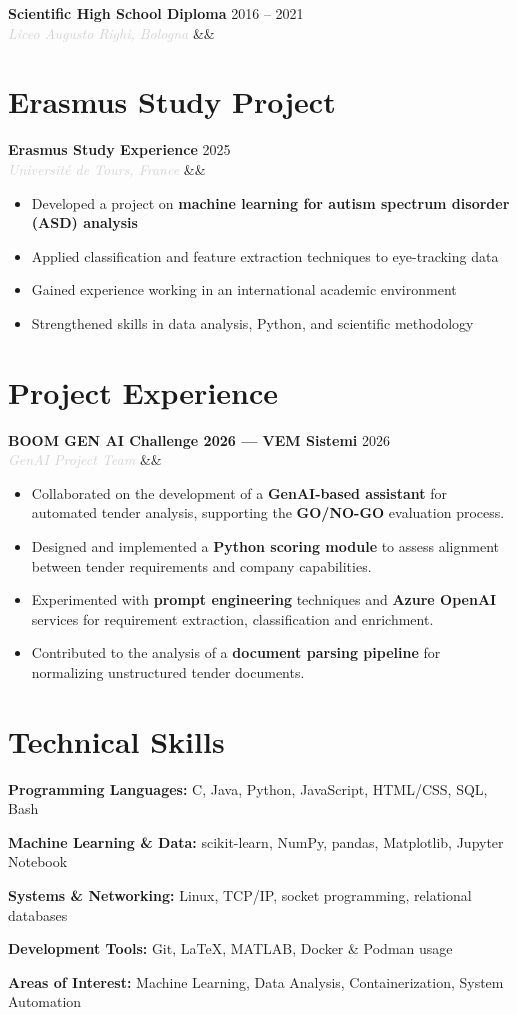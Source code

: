 \documentclass[a4paper,10pt]{article}
\newcommand{\entry}[4]{%
  \noindent\textbf{#1} \hfill \textcolor{accent}{#2}\\
  \textit{\textcolor{lightgray}{#3}}%
  \ifx&#4&\else\\\vspace{0.2em}#4\fi
  \vspace{0.5em}
}
\newcommand{\entrylist}[5]{%
  \noindent\textbf{#1} \hfill \textcolor{accent}{#2}\\
  \textit{\textcolor{lightgray}{#3}}%
  \ifx&#4&\else\\\vspace{0.2em}#4\fi
  \vspace{0.3em}
  \begin{itemize}#5\end{itemize}
  \vspace{0.3em}
}
\newcommand{\skillgroup}[2]{%
  \noindent\textbf{#1:} #2\par\vspace{0.35em}
}
\begin{document}
\entry{Scientific High School Diploma}{2016 -- 2021}{Liceo Augusto Righi, Bologna}{}

\section{Erasmus Study Project}

\entrylist{Erasmus Study Experience}{2025}{Université de Tours, France}{}{
  \item Developed a project on \textbf{machine learning for autism spectrum disorder (ASD) analysis}
  \item Applied classification and feature extraction techniques to eye-tracking data
  \item Gained experience working in an international academic environment
  \item Strengthened skills in data analysis, Python, and scientific methodology
}

\section{Project Experience}

\entrylist{BOOM GEN AI Challenge 2026 — VEM Sistemi}{2026}{GenAI Project Team}{}{
  \item Collaborated on the development of a \textbf{GenAI-based assistant} for automated tender analysis, supporting the \textbf{GO/NO-GO} evaluation process.
  \item Designed and implemented a \textbf{Python scoring module} to assess alignment between tender requirements and company capabilities.
  \item Experimented with \textbf{prompt engineering} techniques and \textbf{Azure OpenAI} services for requirement extraction, classification and enrichment.
  \item Contributed to the analysis of a \textbf{document parsing pipeline} for normalizing unstructured tender documents.
}

\section{Technical Skills}

\skillgroup{Programming Languages}{C, Java, Python, JavaScript, HTML/CSS, SQL, Bash}
\skillgroup{Machine Learning \& Data}{scikit-learn, NumPy, pandas, Matplotlib, Jupyter Notebook}
\skillgroup{Systems \& Networking}{Linux, TCP/IP, socket programming, relational databases}
\skillgroup{Development Tools}{Git, \LaTeX, MATLAB, Docker \& Podman usage}
\skillgroup{Areas of Interest}{Machine Learning,
                               Data Analysis,
                               Containerization, System Automation}
\end{document}
